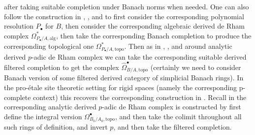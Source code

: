 \documentclass[12pt]{amsart}
\theoremstyle{definition}
\numberwithin{equation}{section}
\begin{document}
after taking suitable completion under Banach norms when needed. One can also follow the construction in \cite{III1}, \cite{III2}, \cite{B1} and \cite{GL} to first consider the corresponding polynomial resolution $P_\bullet$ for $B$, then consider the corresponding algebraic derived de Rham complex $\Omega^*_{P_\bullet/A,\mathrm{alg}}$, then take the corresponding Banach completion to produce the corresponding topological one $\Omega^*_{P_\bullet/A,\mathrm{topo}}$. Then as in \cite{III1}, \cite{III2}, \cite{GL} and \cite{B1} around analytic derived $p$-adic de Rham complex we can take the corresponding suitable derived filtered completion to get the complex $\widehat{\Omega}^{\bullet}_{B/A,\mathrm{topo}}$ (certainly we need to consider Banach version of some filtered derived category of simplicial Banach rings). In the pro-\'etale site theoretic setting for rigid spaces (namely the corresponding p-complete context) this recovers the corresponding construction in \cite{GL}. Recall in \cite{GL} the corresponding analytic derived $p$-adic de Rham complex is constructed by first define the integral version ${\Omega}^{\bullet}_{B_0/A_0,\mathrm{topo}}$, and then take the colimit throughout all such rings of definition, and invert $p$, and then take the filtered completion. 
\end{document}
